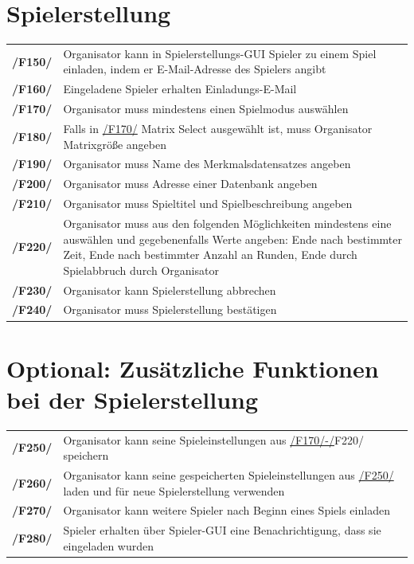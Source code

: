 \documentclass[a4paper]{scrreprt}
\begin{document}
    \section{Spielerstellung}
    \begin{tabularx}{\linewidth}{@{}>{\bfseries}l@{\hspace{.5em}}X@{}}
    \hypertarget{F150}{/F150/} & \Gls{Organisator} kann in Spielerstellungs-GUI \Gls{Spieler} zu einem \Gls{Spiel} einladen, indem er E-Mail-Adresse des \Gls{Spieler}s angibt \\
    \hypertarget{F160}{/F160/} & Eingeladene \Gls{Spieler} erhalten Einladungs-E-Mail \\
    \hypertarget{F170}{/F170/} & \Gls{Organisator} muss mindestens einen \Gls{Spielmodus} auswählen \\
    \hypertarget{F180}{/F180/} & Falls in \hyperlink{F170}{/F170/} \Gls{Matrix Select} ausgewählt ist, muss \Gls{Organisator} Matrixgröße angeben \\
    \hypertarget{F190}{/F190/} & \Gls{Organisator} muss Name des Merkmalsdatensatzes angeben \\
    \hypertarget{F200}{/F200/} & \Gls{Organisator} muss Adresse einer Datenbank angeben \\ %
    \hypertarget{F210}{/F210/} & \Gls{Organisator} muss Spieltitel und Spielbeschreibung angeben \\ %
    \hypertarget{F220}{/F220/} & \Gls{Organisator} muss aus den folgenden Möglichkeiten mindestens eine auswählen und gegebenenfalls Werte angeben: Ende nach bestimmter Zeit, Ende nach bestimmter Anzahl an Runden, Ende durch Spielabbruch durch Organisator \\
    \hypertarget{F230}{/F230/} & \Gls{Organisator} kann Spielerstellung abbrechen \\
    \hypertarget{F240}{/F240/} & \Gls{Organisator} muss Spielerstellung bestätigen \\
    \end{tabularx}
    
    \section{Optional: Zusätzliche Funktionen bei der Spielerstellung}
    \begin{tabularx}{\linewidth}{@{}>{\bfseries}l@{\hspace{.5em}}X@{}}
    \hypertarget{F250}{/F250/} & \Gls{Organisator} kann seine \Gls{Spieleinstellungen} aus \hyperlink{F170}{/F170/-/}F220/ speichern \\
    \hypertarget{F260}{/F260/} & \Gls{Organisator} kann seine gespeicherten \Gls{Spieleinstellungen} aus \hyperlink{F250}{/F250/} laden und für neue Spielerstellung verwenden\\
    \hypertarget{F270}{/F270/} & \Gls{Organisator} kann weitere \Gls{Spieler} nach Beginn eines \Gls{Spiel}s einladen \\
    \hypertarget{F280}{/F280/} & \Gls{Spieler} erhalten über Spieler-GUI eine Benachrichtigung, dass sie eingeladen wurden \\ %
	\end{tabularx}
    
\end{document}
